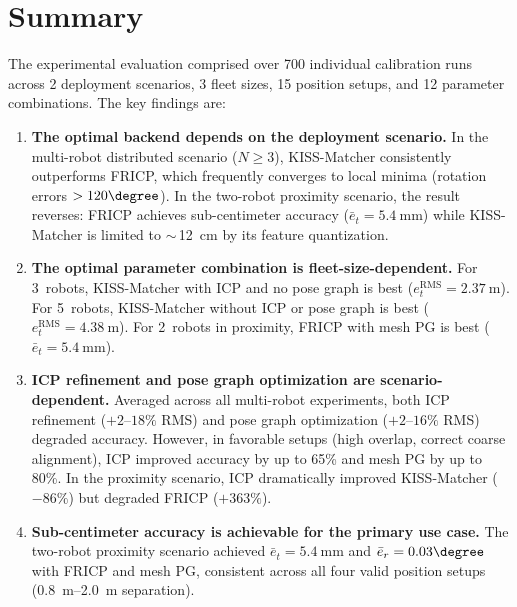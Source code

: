 \section{Summary}
\label{sec:evaluation_summary}

The experimental evaluation comprised over 700 individual
calibration runs across 2 deployment scenarios, 3 fleet sizes,
15 position setups, and 12 parameter combinations.
The key findings are:

\begin{enumerate}
    \item \textbf{The optimal backend depends on the deployment
          scenario.}
          In the multi-robot distributed scenario ($N \geq 3$),
          KISS-Matcher consistently outperforms FRICP, which
          frequently converges to local minima (rotation errors
          $> 120\degree$).
          In the two-robot proximity scenario, the result reverses:
          FRICP achieves sub-centimeter accuracy
          ($\bar{e}_t = \SI{5.4}{\milli\metre}$) while KISS-Matcher
          is limited to $\sim$\,\SI{12}{\centi\metre} by its
          feature quantization.

    \item \textbf{The optimal parameter combination is
          fleet-size-dependent.}
          For 3~robots, KISS-Matcher with ICP and no pose graph is
          best ($e_t^\mathrm{RMS} = \SI{2.37}{\metre}$).
          For 5~robots, KISS-Matcher without ICP or pose graph is
          best ($e_t^\mathrm{RMS} = \SI{4.38}{\metre}$).
          For 2~robots in proximity, FRICP with mesh PG is best
          ($\bar{e}_t = \SI{5.4}{\milli\metre}$).

    \item \textbf{ICP refinement and pose graph optimization are
          scenario-dependent.}
          Averaged across all multi-robot experiments, both ICP
          refinement ($+2$--$18\%$ RMS) and pose graph optimization
          ($+2$--$16\%$ RMS) degraded accuracy.
          However, in favorable setups (high overlap, correct coarse
          alignment), ICP improved accuracy by up to 65\% and mesh
          PG by up to 80\%.
          In the proximity scenario, ICP dramatically improved
          KISS-Matcher ($-86\%$) but degraded FRICP ($+363\%$).

    \item \textbf{Sub-centimeter accuracy is achievable for the
          primary use case.}
          The two-robot proximity scenario achieved
          $\bar{e}_t = \SI{5.4}{\milli\metre}$ and
          $\bar{e}_r = 0.03\degree$ with FRICP and mesh PG,
          consistent across all four valid position setups
          (\SIrange{0.8}{2.0}{\metre} separation).


\end{enumerate}
